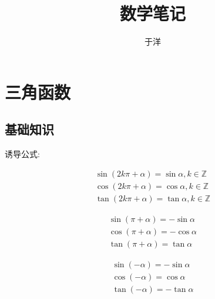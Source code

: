 \documentclass[hyperref, UTF8,11pt,a4paper]{ctexart} %
\title{数学笔记}	%
\author{于洋}			%
\date{}					%
\begin{document}
\tableofcontents
\maketitle

\newpage

\section{三角函数}


\subsection{基础知识}
诱导公式:
\begin{figure}[!h] %
	\centering
	\begin{minipage}{170pt}
		$$
			\begin{array}{l}{\sin (2 k \pi+\alpha)=\sin \alpha, k \in \mathbb{Z}} \\ {\cos (2 k \pi+\alpha)=\cos \alpha, k \in \mathbb{Z}} \\ {\tan (2 k \pi+\alpha)=\tan \alpha, k \in \mathbb{Z}}\end{array}
		$$
	\end{minipage}
	\hspace{10pt}
	\begin{minipage}{170pt}
		$$
			\begin{array}{c}{\sin (\pi+\alpha)=-\sin \alpha} \\ {\cos (\pi+\alpha)=-\cos \alpha} \\ {\tan (\pi+\alpha)=\tan \alpha}\end{array}
		$$
	\end{minipage}
	\hspace{10pt}
	\begin{minipage}{170pt}
		$$
			\begin{array}{c}{\sin (-\alpha)=-\sin \alpha} \\ {\cos (-\alpha)=\cos \alpha} \\ {\tan (-\alpha)=-\tan \alpha}\end{array}
		$$
	\end{minipage}
\end{figure}
\end{document}
